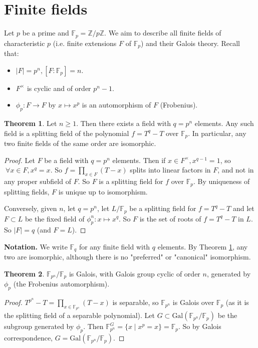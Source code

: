 \documentclass{article}
\theoremstyle{definition}
\newtheorem{theorem}{Theorem}[section]
\begin{document}
\section{Finite fields}

Let $p$ be a prime and $\mathbb{F}_p = \mathbb{Z}/p\mathbb{Z}$. We aim to describe all finite fields of characteristic $p$ (i.e. finite extensions $F$ of $\mathbb{F}_p$) and their Galois theory. Recall that:
\begin{itemize}
    \item $|F|=p^n, [F : \mathbb{F}_p] = n$.
    \item $F^{\times}$ is cyclic and of order $p^n-1$.
    \item $\phi_p : F \to F$ by $x \mapsto x^p$ is an automorphism of $F$ (Frobenius).
\end{itemize}
\begin{theorem}\label{10.1}
    Let $n\ge 1$. Then there exists a field with $q=p^n$ elements. Any such field is a splitting field of the polynomial $f=T^q-T$ over $\mathbb{F}_p$. In particular, any two finite fields of the same order are isomorphic.
\end{theorem}
\begin{proof}
    Let $F$ be a field with $q=p^n$ elements. Then if $x \in F^{\times}, x^{q-1}=1$, so $~\forall x \in F, x^q = x$. So $f = \prod_{x \in F}^{} (T-x)$ splits into linear factors in $F$, and not in any proper subfield of $F$. So $F$ is a splitting field for $f$ over $\mathbb{F}_p$. By uniqueness of splitting fields, $F$ is unique up to isomorphism.
    \vspace{1mm}
    
    Conversely, given $n$, let $q=p^n$, let $L/\mathbb{F}_p$ be a splitting field for $f = T^q - T$ and let $F \subset L$ be the fixed field of $\phi_p^n : x \mapsto x^q$. So $F$ is the set of roots of $f= T^q-T$ in $L$. So $|F|=q$ (and $F=L$).
\end{proof}
\textbf{Notation.}  We write $\mathbb{F}_q$ for any finite field with $q$ elements. By Theorem \ref{10.1}, any two are isomorphic, although there is no "preferred" or "canonical" isomorphism.
\begin{theorem}
    $\mathbb{F}_{p^n}/\mathbb{F}_p$ is Galois, with Galois group cyclic of order $n$, generated by $\phi_p$ (the Frobenius automorphism).
\end{theorem}
\begin{proof}
    $T^{p^n}-T = \prod_{x \in \mathbb{F}_{p^n}}^{} (T-x)$ is separable, so $\mathbb{F}_{p^n}$ is Galois over $\mathbb{F}_p$ (as it is the splitting field of a separable polynomial). Let $G\subset \text{Gal}(\mathbb{F}_{p^n}/\mathbb{F}_p)$ be the subgroup generated by $\phi_p$. Then $\mathbb{F}_{p^n}^{G} = \{x \mid x^p = x\} = \mathbb{F}_p$. So by Galois correspondence, $G = \text{Gal}(\mathbb{F}_{p^n}/\mathbb{F}_p)$.
\end{proof}
\end{document}
